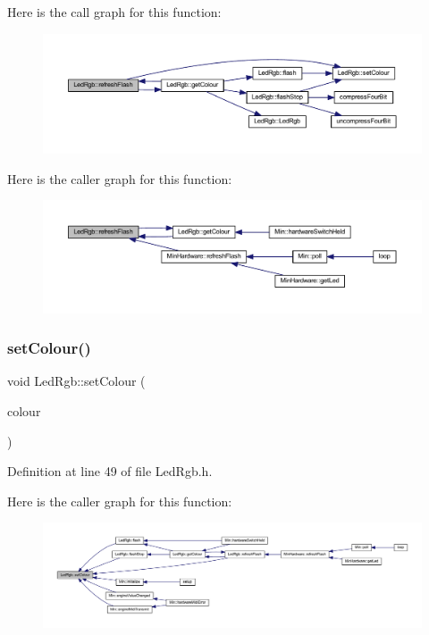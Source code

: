 Here is the call graph for this function\+:
\nopagebreak
\begin{figure}[H]
\begin{center}
\leavevmode
\includegraphics[width=350pt]{dc/d6d/class_led_rgb_a31cf89e0117af309c00a60a7ca1bf486_cgraph}
\end{center}
\end{figure}
Here is the caller graph for this function\+:
\nopagebreak
\begin{figure}[H]
\begin{center}
\leavevmode
\includegraphics[width=350pt]{dc/d6d/class_led_rgb_a31cf89e0117af309c00a60a7ca1bf486_icgraph}
\end{center}
\end{figure}
\mbox{\label{class_led_rgb_a1bc08ef61237fad334dcc750aa445e36}} 
\subsubsection{\texorpdfstring{set\+Colour()}{setColour()}}
{\footnotesize\ttfamily void Led\+Rgb\+::set\+Colour (\begin{DoxyParamCaption}\item[{\hyperlink{class_led_rgb_af328c665510f921f0dfed643f939087b}{Led\+Rgb\+Colour}}]{colour }\end{DoxyParamCaption})\hspace{0.3cm}{\ttfamily [inline]}}



Definition at line 49 of file Led\+Rgb.\+h.

Here is the caller graph for this function\+:
\nopagebreak
\begin{figure}[H]
\begin{center}
\leavevmode
\includegraphics[width=350pt]{dc/d6d/class_led_rgb_a1bc08ef61237fad334dcc750aa445e36_icgraph}
\end{center}
\end{figure}


